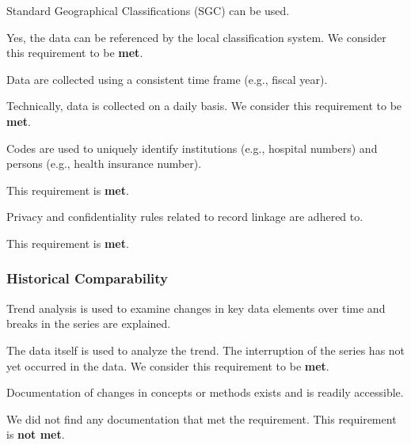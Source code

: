 \begin{QandA}
    \item Standard Geographical Classifications (SGC) can be used.
    \begin{answered}
        Yes, the data can be referenced by the local classification system.
        We consider this requirement to be \textbf{met}.
    \end{answered}

    \item Data are collected using a consistent time frame (e.g., fiscal year).
    \begin{answered}
        Technically, data is collected on a daily basis.
        We consider this requirement to be \textbf{met}.
    \end{answered}

    \item Codes are used to uniquely identify institutions (e.g., hospital numbers) and persons (e.g., health insurance number).
    \begin{answered}
        This requirement is \textbf{met}.
    \end{answered}

    \item Privacy and confidentiality rules related to record linkage are adhered to.
    \begin{answered}
        This requirement is \textbf{met}.
    \end{answered}

\end{QandA}

\subsubsection{Historical Comparability}

\begin{QandA}
    \item Trend analysis is used to examine changes in key data elements over time and breaks in the series are explained.
    \begin{answered}
        The data itself is used to analyze the trend.
        The interruption of the series has not yet occurred in the data.
        We consider this requirement to be \textbf{met}.
    \end{answered}

    \item Documentation of changes in concepts or methods exists and is readily accessible.
    \begin{answered}
        We did not find any documentation that met the requirement.
        This requirement is \textbf{not met}.
    \end{answered}

\end{QandA}

